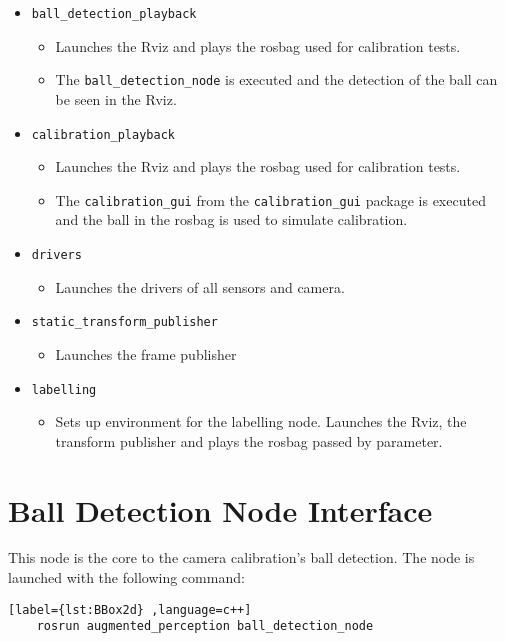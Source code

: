 \begin{itemize}
	\item \texttt{ball\_detection\_playback}
	\begin{itemize}
		\item Launches the Rviz and plays the rosbag used for calibration tests. 
		\item The \texttt{ball\_detection\_node} is executed and the detection of the ball can be seen in the Rviz.
	\end{itemize}
	\item \texttt{calibration\_playback}
	\begin{itemize}
		\item Launches the Rviz and plays the rosbag used for calibration tests. 
		\item The \texttt{calibration\_gui} from the \texttt{calibration\_gui} package is executed and the ball in the rosbag is used to simulate calibration.
	\end{itemize}
	\item \texttt{drivers}
	\begin{itemize}
		\item Launches the drivers of all sensors and camera.
	\end{itemize}
	\item \texttt{static\_transform\_publisher}
	\begin{itemize}
		\item Launches the frame publisher
	\end{itemize}
	\item \texttt{labelling}
	\begin{itemize}
		\item Sets up environment for the labelling node. Launches the Rviz, the transform publisher and plays the rosbag passed by parameter.
	\end{itemize}	
\end{itemize}

\section{Ball Detection Node Interface}

This node is the core to the camera calibration's ball detection. The node is launched with the following command:

\begin{center}
	\begin{lstlisting}[label={lst:BBox2d} ,language=c++]
	rosrun augmented_perception ball_detection_node\end{lstlisting}
\end{center}

